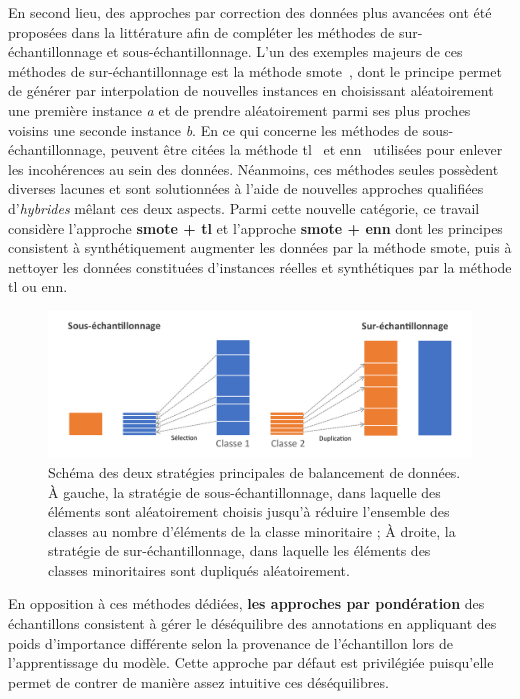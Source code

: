 En second lieu, des approches par correction des données plus avancées ont été proposées dans la littérature afin de compléter les méthodes de sur-échantillonnage et sous-échantillonnage. L'un des exemples majeurs de ces méthodes de sur-échantillonnage est la méthode \gls{smote}~\cite{Chawla2002}, dont le principe permet de générer par interpolation de nouvelles instances en choisissant aléatoirement une première instance \textit{a} et de prendre aléatoirement parmi ses plus proches voisins une seconde instance \textit{b}. En ce qui concerne les méthodes de sous-échantillonnage, peuvent être citées la méthode \gls{tl}~\cite{Tomek1976} et \gls{enn}~\cite{Wilson1972} utilisées pour enlever les incohérences au sein des données. Néanmoins, ces méthodes seules possèdent diverses lacunes et sont solutionnées à l'aide de nouvelles approches qualifiées d'\textit{hybrides} mêlant ces deux aspects. Parmi cette nouvelle catégorie, ce travail considère l'approche \textbf{\gls{smote} + \gls{tl}} et l'approche \textbf{\gls{smote} + \gls{enn}} dont les principes consistent à synthétiquement augmenter les données par la méthode \gls{smote}, puis à nettoyer les données constituées d'instances réelles et synthétiques par la méthode \gls{tl} ou \gls{enn}.

\begin{figure}[H]
    \centering
    \includegraphics[width=\linewidth]{contents/chapter_5/resources/scheme_data_balancing.pdf}
    \caption{Schéma des deux stratégies principales de balancement de données. À gauche, la stratégie de sous-échantillonnage, dans laquelle des éléments sont aléatoirement choisis jusqu'à réduire l'ensemble des classes au nombre d'éléments de la classe minoritaire ; À droite, la stratégie de sur-échantillonnage, dans laquelle les éléments des classes minoritaires sont dupliqués aléatoirement.}
    \label{fig:scheme_data_balancing}
\end{figure}\par

En opposition à ces méthodes dédiées, \textbf{les approches par pondération} des échantillons consistent à gérer le déséquilibre des annotations en appliquant des poids d'importance différente selon la provenance de l'échantillon lors de l'apprentissage du modèle. Cette approche par défaut est privilégiée puisqu'elle permet de contrer de manière assez intuitive ces déséquilibres.\par

